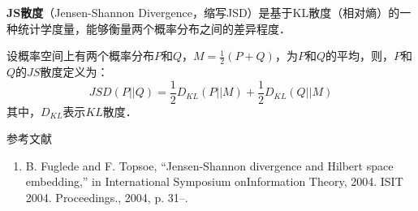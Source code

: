 
\textbf{JS散度}（Jensen-Shannon Divergence，缩写JSD）是基于KL散度（相对熵）的一种统计学度量，能够衡量两个概率分布之间的差异程度．

设概率空间上有两个概率分布$P$和$Q$，$M=\frac{1}{2}(P+Q)$，为$P$和$Q$的平均，则，$P$和$Q$的$JS$散度定义为：
\begin{equation}
JSD(P||Q)=\frac{1}{2}D_{KL}(P||M)+\frac{1}{2}D_{KL}(Q||M)
\end{equation}
其中，$D_{KL}$表示$KL$散度．



参考文献
\begin{enumerate}
\item B. Fuglede and F. Topsoe, “Jensen-Shannon divergence and Hilbert space embedding,” in International Symposium onInformation Theory, 2004. ISIT 2004. Proceedings., 2004, p. 31–.
\end{enumerate}